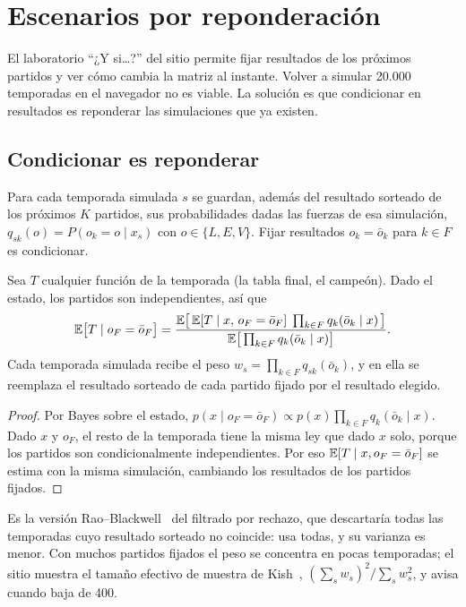 \chapter{Escenarios por reponderación}
\label{cap:escenarios}

El laboratorio ``¿Y si…?'' del sitio permite fijar resultados de los próximos partidos y ver cómo cambia la matriz al instante. Volver a simular 20.000 temporadas en el navegador no es viable. La solución es que condicionar en resultados es reponderar las simulaciones que ya existen.

\section{Condicionar es reponderar}

Para cada temporada simulada $s$ se guardan, además del resultado sorteado de los próximos $K$ partidos, sus probabilidades dadas las fuerzas de esa simulación, $q_{sk}(o)=P(o_k=o\mid x_s)$ con $o\in\{L,E,V\}$. Fijar resultados $o_k=\bar o_k$ para $k\in F$ es condicionar.

\begin{proposicion}[Reponderación] \dem
Sea $T$ cualquier función de la temporada (la tabla final, el campeón). Dado el estado, los partidos son independientes, así que
\[
\mathbb{E}\big[T\mid o_F=\bar o_F\big]=\frac{\mathbb{E}\big[\,\mathbb{E}[T\mid x,\,o_F=\bar o_F]\;\prod_{k\in F}q_k(\bar o_k\mid x)\,\big]}{\mathbb{E}\big[\prod_{k\in F}q_k(\bar o_k\mid x)\big]}.
\]
Cada temporada simulada recibe el peso $w_s=\prod_{k\in F}q_{sk}(\bar o_k)$, y en ella se reemplaza el resultado sorteado de cada partido fijado por el resultado elegido.
\end{proposicion}

\begin{proof}
Por Bayes sobre el estado, $p(x\mid o_F=\bar o_F)\propto p(x)\prod_{k\in F}q_k(\bar o_k\mid x)$. Dado $x$ y $o_F$, el resto de la temporada tiene la misma ley que dado $x$ solo, porque los partidos son condicionalmente independientes. Por eso $\mathbb{E}[T\mid x,o_F=\bar o_F]$ se estima con la misma simulación, cambiando los resultados de los partidos fijados.
\end{proof}

Es la versión Rao–Blackwell~\cite{casella1996} del filtrado por rechazo, que descartaría todas las temporadas cuyo resultado sorteado no coincide: usa todas, y su varianza es menor. Con muchos partidos fijados el peso se concentra en pocas temporadas; el sitio muestra el tamaño efectivo de muestra de Kish~\cite{kish1965}, $(\sum_sw_s)^2/\sum_sw_s^2$, y avisa cuando baja de 400.

